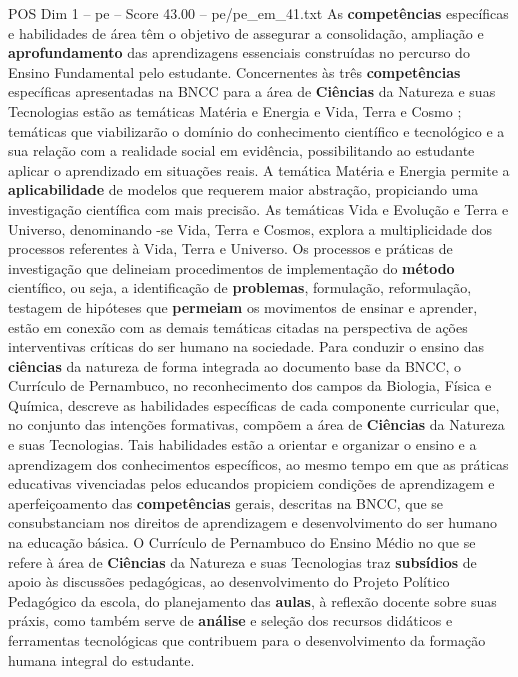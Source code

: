 \begin{textsample}{POS Dim 1 – pe – Score 43.00 – pe/pe\_em\_41.txt}
As \textbf{competências} específicas e habilidades de área têm o objetivo de assegurar a consolidação, ampliação e \textbf{aprofundamento} das aprendizagens essenciais construídas no percurso do Ensino Fundamental pelo estudante.
Concernentes às três \textbf{competências} específicas apresentadas na BNCC para a área de \textbf{Ciências} da Natureza e suas Tecnologias estão as temáticas Matéria e Energia e Vida, Terra e Cosmo ; temáticas que viabilizarão o domínio do conhecimento científico e tecnológico e a sua relação com a realidade social em evidência, possibilitando ao estudante aplicar o aprendizado em situações reais.
A temática Matéria e Energia permite a \textbf{aplicabilidade} de modelos que requerem maior abstração, propiciando uma investigação científica com mais precisão.
As temáticas Vida e Evolução e Terra e Universo, denominando -se Vida, Terra e Cosmos, explora a multiplicidade dos processos referentes à Vida, Terra e Universo.
Os processos e práticas de investigação que delineiam procedimentos de implementação do \textbf{método} científico, ou seja, a identificação de \textbf{problemas}, formulação, reformulação, testagem de hipóteses que \textbf{permeiam} os movimentos de ensinar e aprender, estão em conexão com as demais temáticas citadas na perspectiva de ações interventivas críticas do ser humano na sociedade.
Para conduzir o ensino das \textbf{ciências} da natureza de forma integrada ao documento base da BNCC, o Currículo de Pernambuco, no reconhecimento dos campos da Biologia, Física e Química, descreve as habilidades específicas de cada componente curricular que, no conjunto das intenções formativas, compõem a área de \textbf{Ciências} da Natureza e suas Tecnologias.
Tais habilidades estão a orientar e organizar o ensino e a aprendizagem dos conhecimentos específicos, ao mesmo tempo em que as práticas educativas vivenciadas pelos educandos propiciem condições de aprendizagem e aperfeiçoamento das \textbf{competências} gerais, descritas na BNCC, que se consubstanciam nos direitos de aprendizagem e desenvolvimento do ser humano na educação básica.
O Currículo de Pernambuco do Ensino Médio no que se refere à área de \textbf{Ciências} da Natureza e suas Tecnologias traz \textbf{subsídios} de apoio às discussões pedagógicas, ao desenvolvimento do Projeto Político Pedagógico da escola, do planejamento das \textbf{aulas}, à reflexão docente sobre suas práxis, como também serve de \textbf{análise} e seleção dos recursos didáticos e ferramentas tecnológicas que contribuem para o desenvolvimento da formação humana integral do estudante.

\end{textsample}
